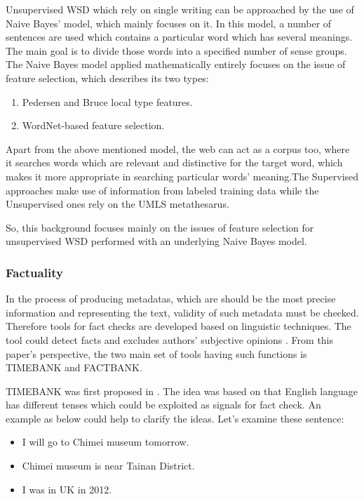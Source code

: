 Unsupervised WSD which rely on single writing can be approached by the use of Naive Bayes' model, which mainly focuses on it. In this model, a number of sentences are used which contains a particular word which has several meanings. The main goal is to divide those words into a specified number of sense groups.
The Naive Bayes model applied mathematically entirely focuses on the issue of feature selection, which describes its two types:

\begin{enumerate}
	\item Pedersen and Bruce local type features.
	\item WordNet-based feature selection.
\end{enumerate}

Apart from the above mentioned model, the web can act as a corpus too, where it searches words which are relevant and distinctive for the target word, which makes it more appropriate in searching particular words' meaning.The Supervised approaches make use of information from labeled training data while the Unsupervised ones rely on the UMLS metathesarus.

So, this background focuses mainly on the issues of feature selection for unsupervised WSD performed with an underlying Naive Bayes model.



\subsubsection*{Factuality}
In the process of producing metadatas, which are should be the most precise information and representing the text, validity of such metadata must be checked. Therefore tools for fact checks are developed based on linguistic techniques.  The tool could detect facts and excludes authors' subjective opinions \cite{agerri2015big}. From this paper's perspective, the two main set of tools having such functions is TIMEBANK and FACTBANK.

TIMEBANK was first proposed in \cite{pustejovsky2003timebank}. The idea was based on that English language has different tenses which could be exploited as signals for fact check. An example as below could help to clarify the ideas. Let's examine these sentence:

\begin{itemize}
	\item I will go to Chimei museum tomorrow.
	\item Chimei museum is near Tainan District.
	\item I was in UK in 2012.
\end{itemize}

